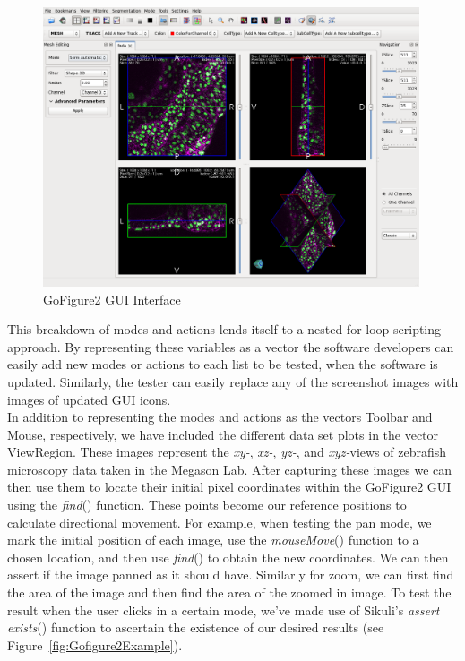 \documentclass{InsightArticle}
\begin{document}
\begin{figure}[tbp]
 \centering
 \includegraphics[width=0.99\textwidth]{Images/Gofigure2GUI.png}
 \caption{GoFigure2 GUI Interface}
 \label{fig:GoFigure2GUI}
\end{figure}


This breakdown of modes and actions lends itself to a nested for-loop scripting
approach. By representing these variables as a vector the software developers
can easily add new modes or actions to each list to be tested, when the software
is updated. Similarly, the tester can easily replace any of the screenshot
images with images of updated GUI icons.\\  

In addition to representing the modes and actions as the vectors Toolbar and
Mouse, respectively, we have included the different data set plots in the
vector ViewRegion. These images represent the \emph{xy-}, \emph{xz-},
\emph{yz-}, and \emph{xyz-}views of zebrafish microscopy data taken in the
Megason Lab. After capturing these images we can then use them to locate their
initial pixel coordinates within the GoFigure2 GUI using the \emph{find}()
function. These points become our reference positions to calculate directional
movement.  For example, when testing the pan mode, we mark the initial position
of each image, use the \emph{mouseMove}() function to a chosen location, and
then use \emph{find}() to obtain the new coordinates. We can then assert if the
image panned as it should have. Similarly for zoom, we can first find the area
of the image and then find the area of the zoomed in image.  To test the result
when the user clicks in a certain mode, we've made use of Sikuli's \emph{assert
exists}() function to ascertain the existence of our desired results (see
Figure~\ref{fig:Gofigure2Example}).\\
\end{document}
